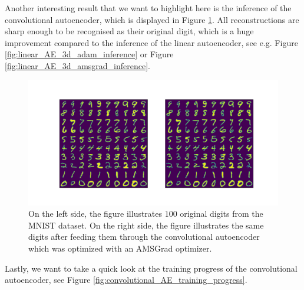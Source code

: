 Another interesting result that we want to highlight here is the inference of the convolutional autoencoder, which is displayed in Figure \ref{fig:convolutional_AE_inference}. All reconstructions are sharp enough to be recognised as their original digit, which is a huge improvement compared to the inference of the linear autoencoder, see e.g. Figure \ref{fig:linear_AE_3d_adam_inference} or Figure \ref{fig:linear_AE_3d_amsgrad_inference}.


\begin{figure}
\begin{center}
      \includegraphics[trim = 15mm 10mm 15mm 15mm, clip, width=\linewidth]{convolutional_AE_inference}
\end{center}
\caption{On the left side, the figure illustrates $100$ original digits from the MNIST dataset. On the right side, the figure illustrates the same digits after feeding them through the convolutional autoencoder which was optimized with an AMSGrad optimizer.}\label{fig:convolutional_AE_inference}
\end{figure}


Lastly, we want to take a quick look at the training progress of the convolutional autoencoder, see Figure \ref{fig:convolutional_AE_training_progress}.

